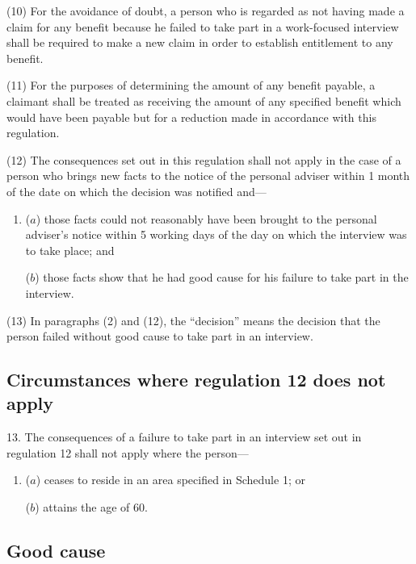 \documentclass[12pt,a4paper]{article}
\begin{document}
(10) For the avoidance of doubt, a person who is regarded as not having made a claim for any benefit because he failed to take part in a work-focused interview shall be required to make a new claim in order to establish entitlement to any benefit.

(11) For the purposes of determining the amount of any benefit payable, a claimant shall be treated as receiving the amount of any specified benefit which would have been payable but for a reduction made in accordance with this regulation.

(12) The consequences set out in this regulation shall not apply in the case of a person who brings new facts to the notice of the personal adviser within 1 month of the date on which the decision was notified and—
\begin{enumerate}\item[]
($a$) those facts could not reasonably have been brought to the personal adviser’s notice within 5 working days of the day on which the interview was to take place; and

($b$) those facts show that he had good cause for his failure to take part in the interview.
\end{enumerate}

(13) In paragraphs (2) and (12), the “decision” means the decision that the person failed without good cause to take part in an interview.

\subsection[13. Circumstances where regulation 12 does not apply]{Circumstances where regulation 12 does not apply}

13.  The consequences of a failure to take part in an interview set out in regulation 12 shall not apply where the person—
\begin{enumerate}\item[]
($a$) ceases to reside in an area specified in Schedule 1; or

($b$) attains the age of 60.
\end{enumerate}

\subsection[14. Good cause]{Good cause}
\end{document}
